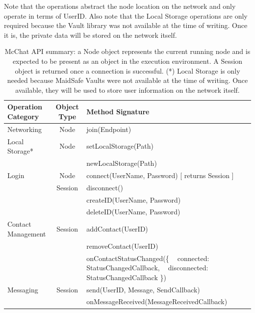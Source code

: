 Note that the operations abstract the node location on the network and only operate in terms of UserID. Also note that the Local Storage operations are only required because the Vault library was not available at the time of writing. Once it is, the private data will be stored on the network itself.

\begin{table}
\centering
\begin{tabular}{|l|c|l|p{8cm}|}
\hline
\textbf{Operation Category} & \textbf{Object Type} & \textbf{Method Signature}\\ 
\hline
Networking & Node & join(Endpoint)\\ 
\hline
Local Storage* & Node & setLocalStorage(Path)\\ 
 &  & newLocalStorage(Path)\\ 
\hline
Login & Node & connect(UserName, Password) [ returns Session ]\\ 
 & Session & disconnect()\\ 
 &  & createID(UserName, Password)\\ 
 &  & deleteID(UserName, Password)\\ 
\hline
Contact Management & Session & addContact(UserID)\\ 
 & & removeContact(UserID)\\ 
 & & \parbox{8cm}{onContactStatusChanged(\{ \\
 $~~~~$connected: StatusChangedCallback,\\
 $~~~~$disconnected: StatusChangedCallback \\
\})}\\ 
\hline
Messaging & Session & send(UserID, Message, SendCallback)\\ 
 &  & onMessageReceived(MessageReceivedCallback)\\ 
\hline\end{tabular}

\caption[McChat API Summary]{\label{tb:McChatAPI} McChat API summary: a Node object represents the current running node and is expected to be present as an object in the execution environment. A Session object is returned once a connection is successful. (*) Local Storage is only needed because MaidSafe Vaults were not available at the time of writing. Once available, they will be used to store user information on the network itself.}
\end{table}

